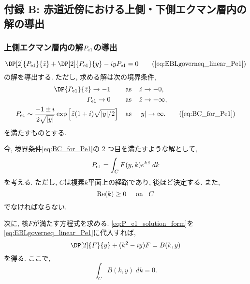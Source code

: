 \subsection*{付録 B: 赤道近傍における上側・下側エクマン層内の解の導出}
\renewcommand{\theequation}{B.\arabic{equation}}
\setcounter{equation}{0}
\subsubsection{上側エクマン層内の解$P_{\rm e1}$の導出}
\begin{equation*}
  \DP[2]{P_{\rm e1}}{\tilde{z}} + \DP[2]{P_{\rm e1}}{y} - iy P_{\rm e1} = 0
\tag{\ref{eq:EBLgoverneq_linear_Pe1}}
\end{equation*}
の解を導出する. 
ただし, 求める解は次の境界条件, 
 \begin{align*}
    \DP{P_{\rm e1}}{\tilde{z}} \to -1  \;\;\;\;\;\;\;\; &{\rm as} \;\;\;\; \tilde{z} \to -0, \\
    P_{\rm e1} \to 0 \;\;\;\;\;\;\;\; &{\rm as} \;\;\;\; \tilde{z} \to - \infty, \\
    P_{\rm e1} \sim \dfrac{-1 \pm i}{2 \sqrt{|y|}} \exp{\left[ \tilde{z} (1+i) \sqrt{|y|/2} \right]}
       \;\;\;\; &{\rm as} \;\;\;\; |y| \to  \infty. 
  \tag{\ref{eq:BC_for_Pe1}}
 \end{align*}
を満たすものとする. 

今, 境界条件\eqref{eq:BC_for_Pe1}の 2 つ目を満たすような解として, 
\begin{equation}
  P_{\rm e1} = \int_{C} F(y, k) e^{k\tilde{z}} \; dk
\label{eq:P_e1_solution_form}
\end{equation}
を考える. 
ただし, $C$は複素$k$平面上の経路であり, 後ほど決定する. 
また, 
\begin{equation}
  {\rm Re} (k) \geq 0 \;\;\;\;\; {\rm on} \;\;\; C
\end{equation}
でなければならない. 

次に, 核$F$が満たす方程式を求める. 
\eqref{eq:P_e1_solution_form}を\eqref{eq:EBLgoverneq_linear_Pe1}に代入すれば, 
\begin{equation}
  \DP[2]{F}{y} + (k^2 - iy) F = B(k,y)
\label{eq:ODE_for_F}
\end{equation}
を得る. 
ここで, 
\begin{equation}
  \int_C B(k,y) \; dk = 0.
\end{equation}

